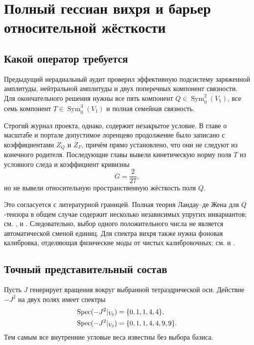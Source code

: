 \chapter{Полный гессиан вихря и барьер относительной жёсткости}

\section{Какой оператор требуется}

Предыдущий нерадиальный аудит проверил эффективную подсистему заряженной
амплитуды, нейтральной амплитуды и двух поперечных компонент связности.
Для окончательного решения нужны все пять компонент
$Q\in\operatorname{Sym}_0^2(V_1)$, все семь компонент
$T\in\operatorname{Sym}_0^3(V_1)$ и полная семейная связность.

Строгий журнал проекта, однако, содержит незакрытое условие. В главе о
масштабе и портале допустимое лоренцево продолжение было записано с
коэффициентами $Z_Q$ и $Z_F$, причём прямо установлено, что они не
следуют из конечного родителя. Последующие главы вывели кинетическую
норму поля $T$ из условного следа и коэффициент кривизны
\begin{equation}
 G=\frac{2}{27},
\end{equation}
но не вывели относительную пространственную жёсткость поля $Q$.

Это согласуется с литературной границей. Полная теория Ландау--де Жена
для $Q$-тензора в общем случае содержит несколько независимых упругих
инвариантов; см. ,  и
. Следовательно, выбор одного положительного числа
не является автоматической сменой единиц. Для спектра вихря также нужна
фоновая калибровка, отделяющая физические моды от чистых калибровочных;
см.  и .

\section{Точный представительный состав}

Пусть $J$ генерирует вращения вокруг выбранной тетраэдрической оси.
Действие $-J^2$ на двух полях имеет спектры
\begin{align}
 \operatorname{Spec}(-J^2|_{V_2})&=\{0,1,1,4,4\},\\
 \operatorname{Spec}(-J^2|_{V_3})&=\{0,1,1,4,4,9,9\}.
\end{align}
Тем самым все внутренние угловые веса известны без выбора базиса.

